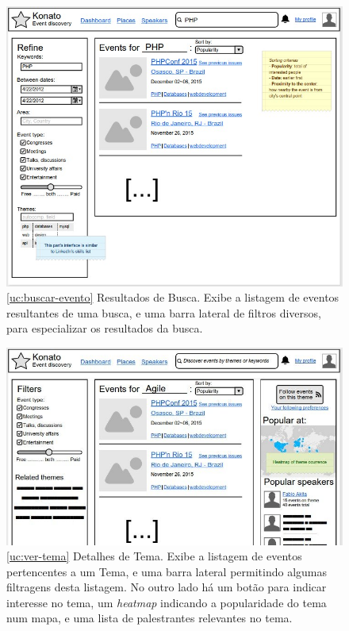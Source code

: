 \documentclass[12pt,a4paper,twoside,hyphens,english,brazil]{abntex2}
\begin{document}
{\begin{figure}[h]
\centering
	\includegraphics[width=1\linewidth]{imagens/prototipos/1-1_Search.jpg}
	\caption[Resultados de Busca]{\ref{uc:buscar-evento} Resultados de Busca. Exibe a listagem de eventos resultantes de uma busca, e uma barra lateral de filtros diversos, para especializar os resultados da busca.}
	\label{prot:search}
\end{figure}

\begin{figure}[h]
\centering
	\includegraphics[width=1\linewidth]{imagens/prototipos/1-3_Theme_details.jpg}
	\caption[Detalhes de um Tema]{\ref{uc:ver-tema} Detalhes de Tema. Exibe a listagem de eventos pertencentes a um Tema, e uma barra lateral permitindo algumas filtragens desta listagem. No outro lado há um botão para indicar interesse no tema, um \emph{heatmap} indicando a popularidade do tema num mapa, e uma lista de palestrantes relevantes no tema.}
	\label{prot:list-themes}
\end{figure}

}
\end{document}
